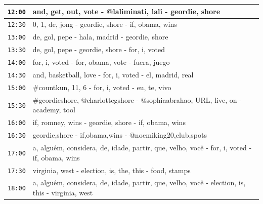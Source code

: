 \documentclass{sig-alternate}
\begin{document}

\begin{table}
\begin{center}
\small
\begin{tabular}{|p{.6cm}|p{7.5cm}|}
\hline %
\texttt{12:00} & and, get, out, vote - @laliminati, lali - geordie, shore \\\hline 
\texttt{12:30} & 0, 1, de, jong - geordie, shore - if, obama, wins \\\hline 
\texttt{13:00} & de, gol, pepe - hala, madrid - geordie, shore \\\hline 
\texttt{13:30} & de, gol, pepe - geordie, shore - for, i, voted \\\hline 
\texttt{14:00} & for, i, voted - for, obama, vote - fuera, juego \\\hline 
\texttt{14:30} & and, basketball, love - for, i, voted - el, madrid, real \\\hline 
\texttt{15:00} & \#countkun, 11, 6 - for, i, voted - eu, te, vivo \\\hline 
\texttt{15:30} & \#geordieshore, @charlottegshore - @sophiaabrahao, URL, live, on - academy, tool \\\hline 
\texttt{16:00} & if, romney, wins - geordie, shore - if, obama, wins \\\hline 
\texttt{16:30} & geordie,shore - if,obama,wins - @noemiking20,club,spots \\\hline 
\texttt{17:00} & a, algu\'{e}m, considera, de, idade, partir, que, velho, voc\^{e}  - for, i, voted - if, obama, wins \\\hline 
\texttt{17:30} & virginia, west - election, is, the, this - food, stamps \\\hline 
\texttt{18:00} & a, algu\'{e}m, considera, de, idade, partir, que, velho, voc\^{e}  - election, is, this - virginia, west \\\hline 

\end{tabular}
\end{center}
\end{table}
\end{document}
